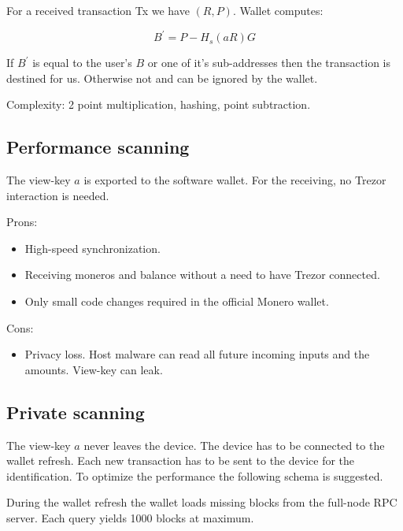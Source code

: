 \documentclass[]{article}
\begin{document}
For a received transaction Tx we have $\left(R, P\right)$.
Wallet computes: 

\begin{equation}
B^\prime = P - H_s(aR)G
\end{equation}

If $B^\prime$ is equal to the user's $B$ or one of it's sub-addresses then the transaction is destined for us. Otherwise not and can be ignored by the wallet.

Complexity: 2 point multiplication, hashing, point subtraction.

\subsection{Performance scanning} 
The view-key $a$ is exported to the software wallet. For the receiving, no Trezor interaction is needed. 

\noindent Prons:
\begin{itemize}
	\item High-speed synchronization.
	\item Receiving moneros and balance without a need to have Trezor connected.
	\item Only small code changes required in the official Monero wallet.
\end{itemize}

\noindent Cons:
\begin{itemize}
	\item Privacy loss. Host malware can read all future incoming inputs and the amounts. View-key can leak.
\end{itemize}

\subsection{Private scanning}
The view-key $a$ never leaves the device. The device has to be connected
to the wallet refresh. 
Each new transaction has to be sent to the device for the identification.
To optimize the performance the following schema is suggested.

\;
During the wallet refresh the wallet loads missing blocks from the full-node RPC server. Each query yields 1000 blocks at maximum. 
\end{document}
